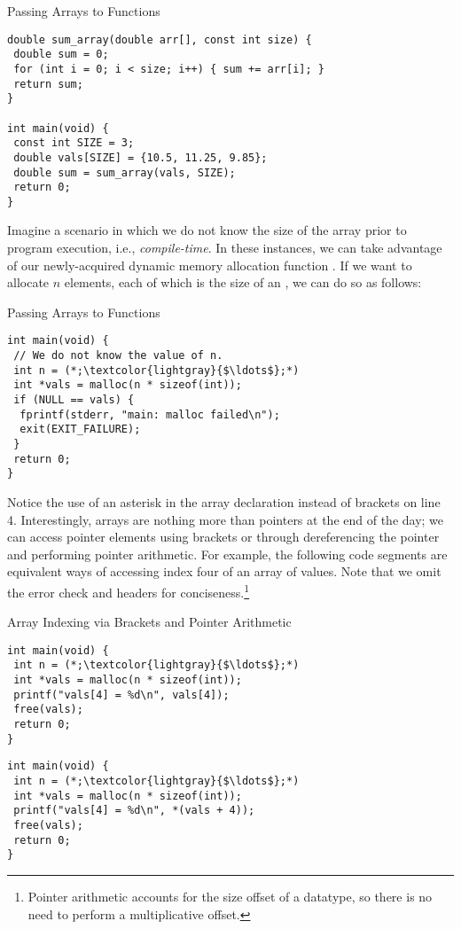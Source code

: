 \begin{cl}[main.c]{Passing Arrays to Functions}
\begin{lstlisting}[language=MyC]
double sum_array(double arr[], const int size) {
 double sum = 0;
 for (int i = 0; i < size; i++) { sum += arr[i]; }
 return sum;
}

int main(void) {
 const int SIZE = 3;
 double vals[SIZE] = {10.5, 11.25, 9.85};
 double sum = sum_array(vals, SIZE);
 return 0;
}
\end{lstlisting}
\end{cl}

Imagine a scenario in which we do not know the size of the array prior to program execution, i.e., \textit{compile-time}. In these instances, we can take advantage of our newly-acquired dynamic memory allocation function . If we want to allocate $n$ elements, each of which is the size of an , we can do so as follows:

\begin{cl}[main.c]{Passing Arrays to Functions}
\begin{lstlisting}[language=MyC]
int main(void) {
 // We do not know the value of n.
 int n = (*;\textcolor{lightgray}{$\ldots$};*)
 int *vals = malloc(n * sizeof(int));
 if (NULL == vals) {
  fprintf(stderr, "main: malloc failed\n");
  exit(EXIT_FAILURE);
 }
 return 0;
}
\end{lstlisting}
\end{cl}

Notice the use of an asterisk in the array declaration instead of brackets on line 4. Interestingly, arrays are nothing more than pointers at the end of the day; we can access pointer elements using brackets or through dereferencing the pointer and performing pointer arithmetic. For example, the following code segments are equivalent ways of accessing index four of an array of  values. Note that we omit the error check and headers for conciseness.\footnote{Pointer arithmetic accounts for the size offset of a datatype, so there is no need to perform a multiplicative offset.}

\begin{clrr}[main.c]{Array Indexing via Brackets and Pointer Arithmetic}
\begin{lstlisting}[language=MyC]
int main(void) {
 int n = (*;\textcolor{lightgray}{$\ldots$};*)
 int *vals = malloc(n * sizeof(int));
 printf("vals[4] = %d\n", vals[4]);
 free(vals);
 return 0;
}
\end{lstlisting}
\tcblower
\begin{lstlisting}[language=MyNLNC]
int main(void) {
 int n = (*;\textcolor{lightgray}{$\ldots$};*)
 int *vals = malloc(n * sizeof(int));
 printf("vals[4] = %d\n", *(vals + 4));
 free(vals);
 return 0;
}
\end{lstlisting}
\end{clrr}

